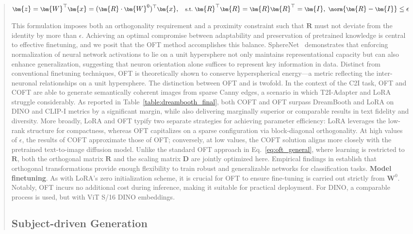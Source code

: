 \begin{itemize}[leftmargin=*,nosep]
\begin{abstract}
\begin{equation}\label{eq:coft_general}
    \footnotesize
    \bm{z}=\bm{W}^\top\bm{x}=(\bm{R}\cdot\bm{W}^0)^\top\bm{x},~~~\text{s.t.}~\bm{R}^\top\bm{R}=\bm{R}\bm{R}^\top=\bm{I},~\norm{\bm{R}-\bm{I}}\leq \epsilon
\end{equation}

This formulation imposes both an orthogonality requirement and a proximity constraint such that $\bm{R}$ must not deviate from the identity by more than $\epsilon$. Achieving an optimal compromise between adaptability and preservation of pretrained knowledge is central to effective finetuning, and we posit that the OFT method accomplishes this balance. SphereNet~\cite{liu2017deep} demonstrates that enforcing normalization of neural network activations to lie on a unit hypersphere not only maintains representational capacity but can also enhance generalization, suggesting that neuron orientation alone suffices to represent key information in data. Distinct from conventional finetuning techniques, OFT is theoretically shown to conserve hyperspherical energy—a metric reflecting the inter-neuronal relationships on a unit hypersphere. The distinction between OFT and \cite{liu2021orthogonal} is twofold. In the context of the C2I task, OFT and COFT are able to generate semantically coherent images from sparse Canny edges, a scenario in which T2I-Adapter and LoRA struggle considerably. As reported in Table~\ref{table:dreambooth_final}, both COFT and OFT surpass DreamBooth and LoRA on DINO and CLIP-I metrics by a significant margin, while also delivering marginally superior or comparable results in text fidelity and diversity. More broadly, LoRA and OFT typify two separate strategies for achieving parameter efficiency: LoRA leverages the low-rank structure for compactness, whereas OFT capitalizes on a sparse configuration via block-diagonal orthogonality. At high values of $\epsilon$, the results of COFT approximate those of OFT; conversely, at low values, the COFT solution aligns more closely with the pretrained text-to-image diffusion model. Unlike the standard OFT approach in Eq.~\eqref{eq:oft_general}, where learning is restricted to $\bm{R}$, both the orthogonal matrix $\bm{R}$ and the scaling matrix $\bm{D}$ are jointly optimized here. Empirical findings in \cite{liu2021orthogonal} establish that orthogonal transformations provide enough flexibility to train robust and generalizable networks for classification tasks. \textbf{Model finetuning}. As with LoRA’s zero initialization scheme, it is crucial for OFT to ensure fine-tuning is carried out strictly from $\bm{W}^0$. Notably, OFT incurs no additional cost during inference, making it suitable for practical deployment. For DINO, a comparable process is used, but with ViT S/16 DINO embeddings. \subsection{Subject-driven Generation}


\end{abstract}
\end{itemize}
